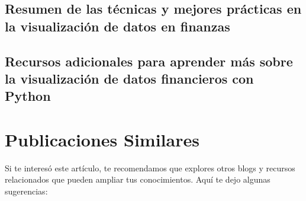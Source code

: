 \documentclass[
  a4paper,
]{article}
\begin{document}
\hypertarget{resumen-de-las-tuxe9cnicas-y-mejores-pruxe1cticas-en-la-visualizaciuxf3n-de-datos-en-finanzas}{%
\subsection{Resumen de las técnicas y mejores prácticas en la
visualización de datos en
finanzas}\label{resumen-de-las-tuxe9cnicas-y-mejores-pruxe1cticas-en-la-visualizaciuxf3n-de-datos-en-finanzas}}

\hypertarget{recursos-adicionales-para-aprender-muxe1s-sobre-la-visualizaciuxf3n-de-datos-financieros-con-python}{%
\subsection{Recursos adicionales para aprender más sobre la
visualización de datos financieros con
Python}\label{recursos-adicionales-para-aprender-muxe1s-sobre-la-visualizaciuxf3n-de-datos-financieros-con-python}}

\hypertarget{publicaciones-similares}{%
\section{Publicaciones Similares}\label{publicaciones-similares}}

Si te interesó este artículo, te recomendamos que explores otros blogs y
recursos relacionados que pueden ampliar tus conocimientos. Aquí te dejo
algunas sugerencias:
\end{document}

